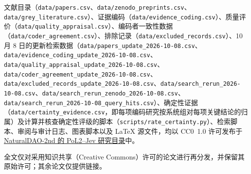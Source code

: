 \begingroup\raggedright
文献目录（\nolinkurl{data/papers.csv}、\nolinkurl{data/zenodo_preprints.csv}、\nolinkurl{data/grey_literature.csv}）、证据编码（\nolinkurl{data/evidence_coding.csv}）、质量评价（\nolinkurl{data/quality_appraisal.csv}）、编码者一致性数据（\nolinkurl{data/coder_agreement.csv}）、排除记录（\nolinkurl{data/excluded_records.csv}）、10 月 8 日的更新检索数据（\nolinkurl{data/papers_update_2026-10-08.csv}、\nolinkurl{data/evidence_coding_update_2026-10-08.csv}、\nolinkurl{data/quality_appraisal_update_2026-10-08.csv}、\nolinkurl{data/coder_agreement_update_2026-10-08.csv}、\nolinkurl{data/excluded_records_update_2026-10-08.csv}、\nolinkurl{data/search_rerun_2026-10-08.csv}、\nolinkurl{data/search_rerun_zenodo_2026-10-08.csv}、\nolinkurl{data/search_rerun_2026-10-08_query_hits.csv}）、确定性证据（\nolinkurl{data/certainty_evidence.csv}，即每项编码研究按系统组对每项关键结论的归属）及计算并核查确定性评级的脚本（\nolinkurl{scripts/rate_certainty.py}）、检索脚本、审阅与审计日志、图表脚本以及 LaTeX 源文件，均以 CC0~1.0 许可发布于 \href{https://github.com/naturaldao/NaturalDAO-2nd/tree/main/PoL-Governance/research/PoL2-Jev-Typed-Literature-Survey}{NaturalDAO-2nd 的 PoL2--Jev 研究目录}中。
\par
\endgroup

全文仅对采用知识共享（Creative Commons）许可的论文进行再分发，并保留其原始许可；其余论文仅提供链接。
